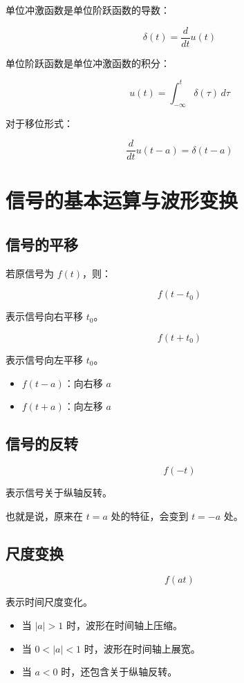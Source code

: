 \documentclass[UTF8]{ctexart}
\begin{document}
单位冲激函数是单位阶跃函数的导数：

\[
\delta(t)=\frac{d}{dt}u(t)
\]

单位阶跃函数是单位冲激函数的积分：

\[
u(t)=\int_{-\infty}^{t}\delta(\tau)\,d\tau
\]

对于移位形式：

\[
\frac{d}{dt}u(t-a)=\delta(t-a)
\]

\section{信号的基本运算与波形变换}

\subsection{信号的平移}

若原信号为 $f(t)$，则：

\[
f(t-t_0)
\]

表示信号向右平移 $t_0$。

\[
f(t+t_0)
\]

表示信号向左平移 $t_0$。

\begin{tcolorbox}[colback=green!5!white,colframe=green!50!black,title=平移判断]
\begin{itemize}
    \item $f(t-a)$：向右移 $a$
    \item $f(t+a)$：向左移 $a$
\end{itemize}
\end{tcolorbox}

\subsection{信号的反转}

\[
f(-t)
\]

表示信号关于纵轴反转。

也就是说，原来在 $t=a$ 处的特征，会变到 $t=-a$ 处。

\subsection{尺度变换}

\[
f(at)
\]

表示时间尺度变化。

\begin{itemize}
    \item 当 $|a|>1$ 时，波形在时间轴上压缩。
    \item 当 $0<|a|<1$ 时，波形在时间轴上展宽。
    \item 当 $a<0$ 时，还包含关于纵轴反转。
\end{itemize}
\end{document}
